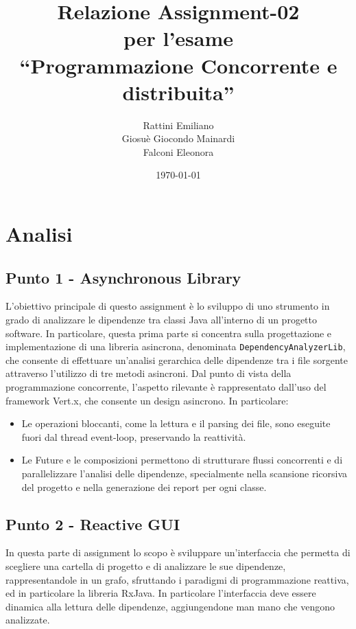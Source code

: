 \documentclass[a4paper,12pt]{report}
\title{Relazione Assignment-02 \\ per l'esame \\ ``Programmazione Concorrente e distribuita''}
\author{Rattini Emiliano\\Giosuè Giocondo Mainardi\\Falconi Eleonora}
\date{\today}
\begin{document}
    \maketitle

    \tableofcontents

    \chapter{Analisi}
    \section{Punto 1 - Asynchronous Library}

    L'obiettivo principale di questo assignment è lo sviluppo di uno strumento in grado di analizzare le dipendenze tra
    classi Java all'interno di un progetto software. In particolare, questa prima parte si concentra sulla progettazione
    e implementazione di una libreria asincrona, denominata \texttt{DependencyAnalyzerLib}, che consente di effettuare
    un'analisi gerarchica delle dipendenze tra i file sorgente attraverso l'utilizzo di tre metodi asincroni.
    Dal punto di vista della programmazione concorrente, l’aspetto rilevante è rappresentato dall’uso del framework Vert.x,
    che consente un design asincrono. In particolare:
    \begin{itemize}
        \item Le operazioni bloccanti, come la lettura e il parsing dei file, sono eseguite fuori dal thread event-loop, preservando la reattività.
        \item Le Future e le composizioni permettono di strutturare flussi concorrenti e di parallelizzare l’analisi delle dipendenze, specialmente nella scansione ricorsiva del progetto e nella generazione dei report per ogni classe.
    \end{itemize}

    \section{Punto 2 - Reactive GUI}

    In questa parte di assignment lo scopo è sviluppare un'interfaccia che permetta di scegliere una cartella di progetto
    e di analizzare le sue dipendenze, rappresentandole in un grafo, sfruttando i paradigmi di programmazione reattiva,
    ed in particolare la libreria RxJava.
    In particolare l'interfaccia deve essere dinamica alla lettura delle dipendenze,
    aggiungendone man mano che vengono analizzate.
\end{document}
